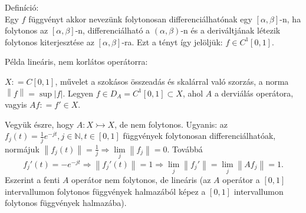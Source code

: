 \documentclass[12pt,a4paper]{scrartcl}
\newenvironment{definicio}{}{}
\newenvironment{pelda}{}{}
\begin{document}
\begin{definicio}

Definíció:\\
Egy \(f\) függvényt akkor nevezünk folytonosan differenciálhatónak egy
\(\left\lbrack {\alpha,\beta} \right\rbrack\)-n, ha folytonos az
\(\left\lbrack {\alpha,\beta} \right\rbrack\)-n, differenciálható a
\(\left( {\alpha,\beta} \right)\)-n és a deriváltjának létezik folytonos
kiterjesztése az \(\left\lbrack {\alpha,\beta} \right\rbrack\)-ra. Ezt a
tényt így jelöljük: \(f \in C^{1}\left\lbrack 0,1 \right\rbrack\).

\end{definicio}

\begin{pelda}

Példa lineáris, nem korlátos operátorra:

\(X: = C\left\lbrack 0,1 \right\rbrack\), művelet a szokásos összeadás
és skalárral való szorzás, a norma
\(\left\| f \right\| = \sup\left| f \right|\). Legyen
\(f \in D_{A} = C^{1}\left\lbrack 0,1 \right\rbrack \subset X\), ahol
\(A\) a derviálás operátora, vagyis \(Af: = f' \in X\).

Vegyük észre, hogy \(\left. A:X\rightarrowtail X \right.\), de nem
folytonos. Ugyanis: az
\(f_{j}\left( t \right) = \frac{1}{j}e^{- jt},j \in {\mathbb{N}},t \in \left\lbrack 0,1 \right\rbrack\)
függvények folytonosan differenciálhatóak, normájuk
\(\left. \left\| {f_{j}\left( t \right)} \right\| = \frac{1}{j}\Rightarrow\underset{j}{\lim}\left\| f_{j} \right\| = 0 \right.\).
Továbbá
\[\left. f_{j}'\left( t \right) = - e^{- jt}\Rightarrow\left\| {f_{j}'\left( t \right)} \right\| = 1\Rightarrow\underset{j}{\lim}\left\| {f_{j}'} \right\| = \underset{j}{\lim}\left\| {Af_{j}} \right\| = 1. \right.\]Eszerint
a fenti \(A\) operátor nem folytonos, de lineáris (az \(A\) operátor a
\(\left\lbrack 0,1 \right\rbrack\) intervallumon folytonos függvények
halmazából képez a \(\left\lbrack 0,1 \right\rbrack\) intervallumon
folytonos függvények halmazába).

\end{pelda}
\end{document}
